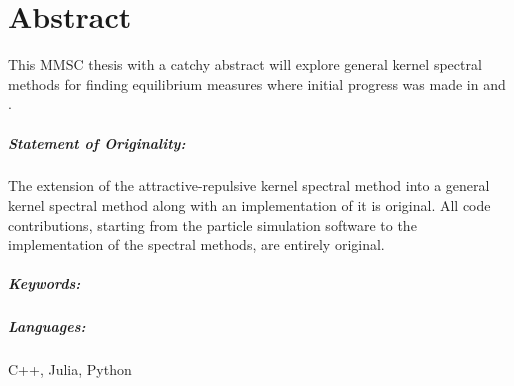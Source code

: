 \chapter*{Abstract}
\label{chap:abstract}
This MMSC thesis with a catchy abstract will explore general kernel spectral methods for finding equilibrium measures where initial progress was made in \cite{2020-power-law-kernels} and \cite{2021-arbitrary-dimensions}.
\hierKoennteIhreWerbungStehen

\paragraph{Statement of Originality:}
The extension of the attractive-repulsive kernel spectral method into a general kernel spectral method along with an implementation of it is original.
All code contributions, starting from the particle simulation software to the implementation of the spectral methods, are entirely original.

\paragraph{Keywords:}
\thesiskeywords

\paragraph{Languages:}
C++, Julia, Python

